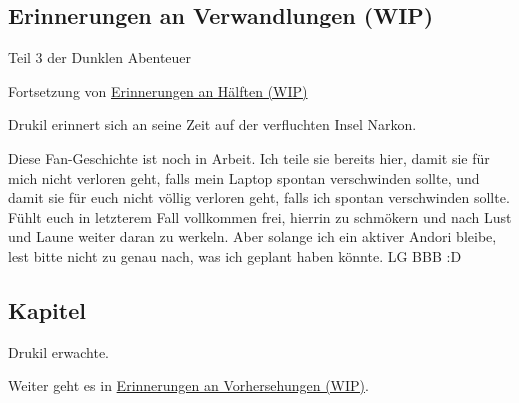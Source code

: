 \begin{chapterbox}
    \chapter{Erinnerungen an Verwandlungen (WIP)}
    \label{wip-erinnerungen-an-verwandlungen}
    
    \begin{center}
        Teil 3 der Dunklen Abenteuer

        Fortsetzung von \hyperref[wip-erinnerungen-an-haelften]{Erinnerungen an Hälften (WIP)}
    \end{center}

    Drukil erinnert sich an seine Zeit auf der verfluchten Insel Narkon.
\end{chapterbox}



Diese Fan-Geschichte ist noch in Arbeit. Ich teile sie bereits hier, damit sie für mich nicht verloren geht, falls mein Laptop spontan verschwinden sollte, und damit sie für euch nicht völlig verloren geht, falls ich spontan verschwinden sollte. Fühlt euch in letzterem Fall vollkommen frei, hierrin zu schmökern und nach Lust und Laune weiter daran zu werkeln. Aber solange ich ein aktiver Andori bleibe, lest bitte nicht zu genau nach, was ich geplant haben könnte. LG BBB :D



\newpage
\section{Kapitel}

Drukil erwachte.




\begin{commentbox}
    Weiter geht es in \hyperref[wip-erinnerungen-an-vorhersehungen]{Erinnerungen an Vorhersehungen (WIP)}.
\end{commentbox}